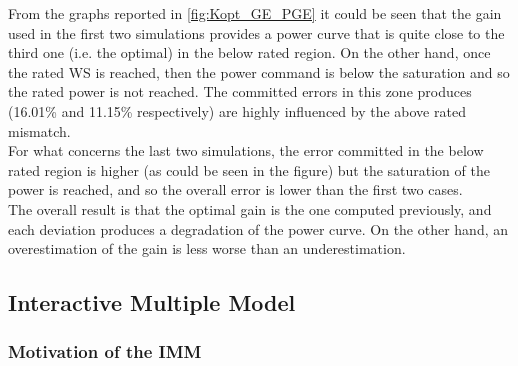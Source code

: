 From the graphs reported in \autoref{fig:Kopt_GE_PGE} it could be seen that the gain used in the first two simulations provides a power curve that is quite close to the third one (i.e. the optimal) in the below rated region. On the other hand, once the rated WS is reached, then the power command is below the saturation and so the rated power is not reached. The committed errors in this zone produces (16.01\% and 11.15\% respectively) are highly influenced by the above rated mismatch. \\
For what concerns the last two simulations, the error committed in the below rated region is higher (as could be seen in the figure) but the saturation of the power is reached, and so the overall error is lower than the first two cases. \\
The overall result is that the optimal gain is the one computed previously, and each deviation produces a degradation of the power curve. On the other hand, an overestimation of the gain is less worse than an underestimation.

\subsection{Interactive Multiple Model}\label{subsec:IMM}
\subsubsection{Motivation of the IMM}
